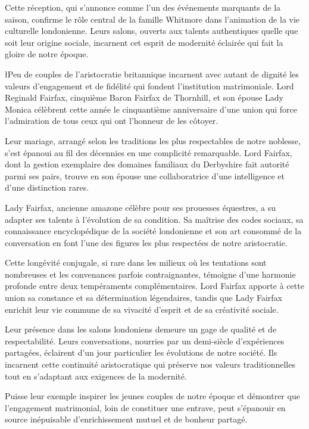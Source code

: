\documentclass{news}
\begin{document}
Cette réception, qui s'annonce comme l'un des événements marquants de la saison, confirme le rôle central de la famille Whitmore dans l'animation de la vie culturelle londonienne. Leurs salons, ouverts aux talents authentiques quelle que soit leur origine sociale, incarnent cet esprit de modernité éclairée qui fait la gloire de notre époque.

\l{P}eu de couples de l'aristocratie britannique incarnent avec autant de dignité les valeurs d'engagement et de fidélité qui fondent l'institution matrimoniale. Lord Reginald Fairfax, cinquième Baron Fairfax de Thornhill, et son épouse Lady Monica célèbrent cette année le cinquantième anniversaire d'une union qui force l'admiration de tous ceux qui ont l'honneur de les côtoyer.

Leur mariage, arrangé selon les traditions les plus respectables de notre noblesse, s'est épanoui au fil des décennies en une complicité remarquable. Lord Fairfax, dont la gestion exemplaire des domaines familiaux du Derbyshire fait autorité parmi ses pairs, trouve en son épouse une collaboratrice d'une intelligence et d'une distinction rares.

Lady Fairfax, ancienne amazone célèbre pour ses prouesses équestres, a su adapter ses talents à l'évolution de sa condition. Sa maîtrise des codes sociaux, sa connaissance encyclopédique de la société londonienne et son art consommé de la conversation en font l'une des figures les plus respectées de notre aristocratie.

Cette longévité conjugale, si rare dans les milieux où les tentations sont nombreuses et les convenances parfois contraignantes, témoigne d'une harmonie profonde entre deux tempéraments complémentaires. Lord Fairfax apporte à cette union sa constance et sa détermination légendaires, tandis que Lady Fairfax enrichit leur vie commune de sa vivacité d'esprit et de sa créativité sociale.

Leur présence dans les salons londoniens demeure un gage de qualité et de respectabilité. Leurs conversations, nourries par un demi-siècle d'expériences partagées, éclairent d'un jour particulier les évolutions de notre société. Ils incarnent cette continuité aristocratique qui préserve nos valeurs traditionnelles tout en s'adaptant aux exigences de la modernité.

Puisse leur exemple inspirer les jeunes couples de notre époque et démontrer que l'engagement matrimonial, loin de constituer une entrave, peut s'épanouir en source inépuisable d'enrichissement mutuel et de bonheur partagé.
\end{document}
